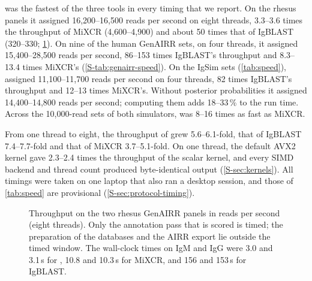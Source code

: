 \documentclass[11pt,a4paper]{article}
\begin{document}
\swig{} was the fastest of the three tools in every timing that we report. On
the
rhesus panels it assigned 16,200--16,500 reads per second on eight threads,
3.3--3.6 times the throughput of MiXCR (4,600--4,900) and about 50 times
that of IgBLAST (320--330; \cref{fig:igbench-timing}). On nine of the human
GenAIRR sets, on four threads, it assigned 15,400--28,500 reads per second,
86--153 times IgBLAST's throughput and 8.3--13.4 times MiXCR's
(\cref{S-tab:genairr-speed}). On the IgSim sets (\cref{tab:speed}), \swig{}
assigned 11,100--11,700 reads per second on four threads, 82 times IgBLAST's
throughput and 12--13 times MiXCR's. Without posterior probabilities it
assigned 14,400--14,800 reads per second; computing them adds 18--33\,\% to
the run time. Across the 10,000-read sets of both simulators, \swig{} was
8--16 times as fast as MiXCR.

From one thread to eight, the throughput of \swig{} grew 5.6--6.1-fold, that
of IgBLAST 7.4--7.7-fold and that of MiXCR 3.7--5.1-fold. On one thread, the
default AVX2 kernel gave 2.3--2.4 times the throughput of the scalar kernel,
and every SIMD backend and thread count produced byte-identical output
(\cref{S-sec:kernels}). All timings were taken on one
laptop that also ran a desktop session, and those of \cref{tab:speed} are
provisional (\cref{S-sec:protocol-timing}).

\begin{figure}[t]
\centering
{}
\caption{Throughput on the two rhesus GenAIRR panels in reads per second
(eight threads). Only the annotation pass that is scored is timed; the
preparation of the databases and the AIRR export lie outside the timed
window. The wall-clock times on IgM and IgG were 3.0 and 3.1\,s for \swig,
10.8 and 10.3\,s for MiXCR, and 156 and 153\,s for IgBLAST.}
\label{fig:igbench-timing}
\end{figure}
\end{document}
